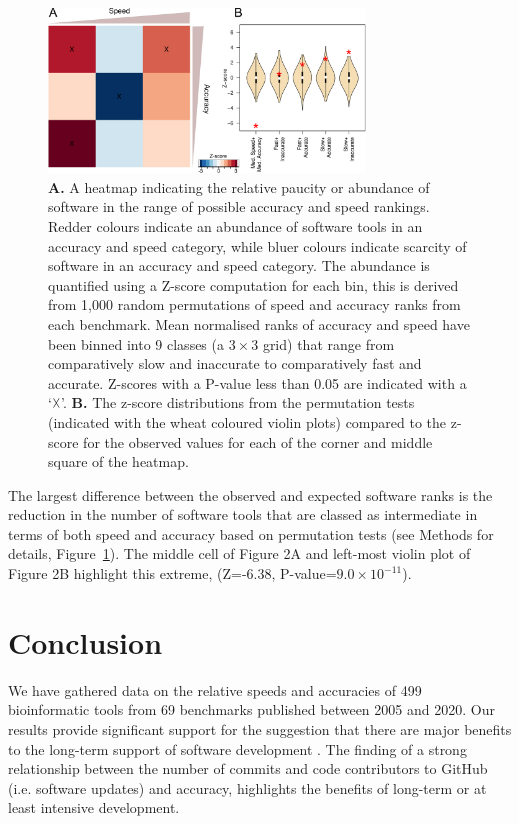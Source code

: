 \documentclass[fleqn,10pt]{SelfArx} %
\def\numTools{499}
\def\numBenchmarkPubs{69}
\begin{document}

\begin{figure}[htb!]
\centering
\includegraphics[width=0.75\textwidth]{figure2.pdf}
\caption{\textbf{A.} A heatmap indicating the relative paucity or abundance of
  software in the range of possible accuracy and speed rankings. Redder
  colours indicate an abundance of software tools in an accuracy and
  speed category, while bluer colours indicate scarcity of software in
  an accuracy and speed category. The abundance is quantified using a
  Z-score computation for each bin, this is derived from 1,000 random
  permutations of speed and accuracy ranks from each
  benchmark. Mean normalised ranks of accuracy and speed have been
  binned into 9 classes (a $3\times 3$ grid) that range from
  comparatively slow and inaccurate to comparatively
  fast and accurate. Z-scores with a P-value less than 0.05 are indicated
  with a ‘$\vartimes$’. \textbf{B.} The z-score distributions from the permutation tests (indicated with the wheat coloured violin plots) compared to 
  the z-score for the observed values for each of the corner and middle square of the heatmap.}
\label{fig:speedaccuracy}
\end{figure}

The largest difference between the observed and expected software ranks is the reduction in the number of software tools that are
classed as intermediate in terms of both speed and accuracy based on
permutation tests (see Methods for details, Figure~\ref{fig:speedaccuracy}). The middle cell
of Figure 2A and left-most violin plot of Figure 2B highlight this extreme, (Z=-6.38,
P-value=$9.0\times 10^{-11}$). 

\section*{Conclusion}

We have gathered data on the relative speeds and accuracies of
{\color{black}\numTools~} bioinformatic tools from
{\color{black}\numBenchmarkPubs} benchmarks published between
2005 and 2020. Our results provide significant support for the suggestion that there are major benefits to
the long-term support of software development \cite{siepel2019challenges}. The
finding of a strong relationship between the number of commits and code contributors to
GitHub (i.e. software updates) and accuracy, highlights the benefits of
long-term or at least intensive development.
\end{document}
